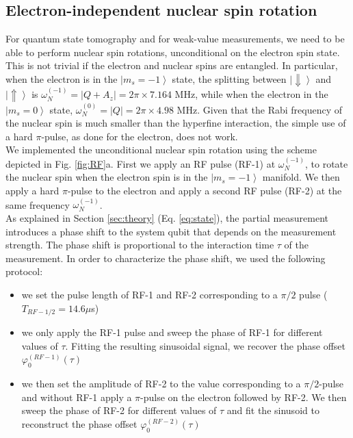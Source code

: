 \subsection{Electron-independent nuclear spin rotation}
\label {sec:uncond_rot_RF}
For quantum state tomography and for weak-value measurements, we need to be able to perform nuclear spin rotations, unconditional on the electron spin state. This is not trivial if the electron and nuclear spins are entangled.
In particular, when the electron is in the $\left| m_s=-1 \right \rangle$ state, the splitting between $\left| \Downarrow \right \rangle$ and $\left| \Uparrow \right \rangle$ is $\omega_N^{(-1)} = |Q+A_z| = 2\pi \times 7.164$ MHz, while when the electron in the $\left| m_s=0 \right \rangle$ state, $\omega_N^{(0)} = |Q| = 2\pi \times 4.98$ MHz. Given that the Rabi frequency of the nuclear spin is much smaller than the hyperfine interaction, the simple use of a hard $\pi$-pulse, as done for the electron, does not work. \\
We implemented the unconditional nuclear spin rotation using the scheme depicted in Fig. \ref{fig:RF}a. First we apply an RF pulse (RF-1) at $\omega_N^{(-1)}$, to rotate the nuclear spin when the electron spin is in the $\left| m_s=-1 \right \rangle$ manifold. We then apply a hard $\pi$-pulse to the electron and apply a second RF pulse (RF-2) at the same frequency $\omega_N^{(-1)}$.\\
As explained in Section \ref{sec:theory} (Eq. \ref{eq:state}), the partial measurement introduces a phase shift to the system qubit that depends on the measurement strength. The phase shift is proportional to the interaction time $\tau$ of the measurement. In order to characterize the phase shift, we used the following protocol:
\begin{itemize}
 \item we set the pulse length of RF-1 and RF-2 corresponding to a $\pi/2$ pulse ($T_{RF-1/2} = 14.6 \mu$s)
 \item we only apply the RF-1 pulse and sweep the phase of RF-1 for different values of $\tau$. Fitting the resulting sinusoidal signal, we recover the phase offset $\varphi_0^{(RF-1)} (\tau)$
 \item we then set the amplitude of RF-2 to the value corresponding to a $\pi/2$-pulse and without RF-1 apply a $\pi$-pulse on the electron followed by RF-2. We then sweep the phase of RF-2 for different values of $\tau$ and fit the sinusoid to reconstruct the phase offset $\varphi_0^{(RF-2)} (\tau)$
\end{itemize}
